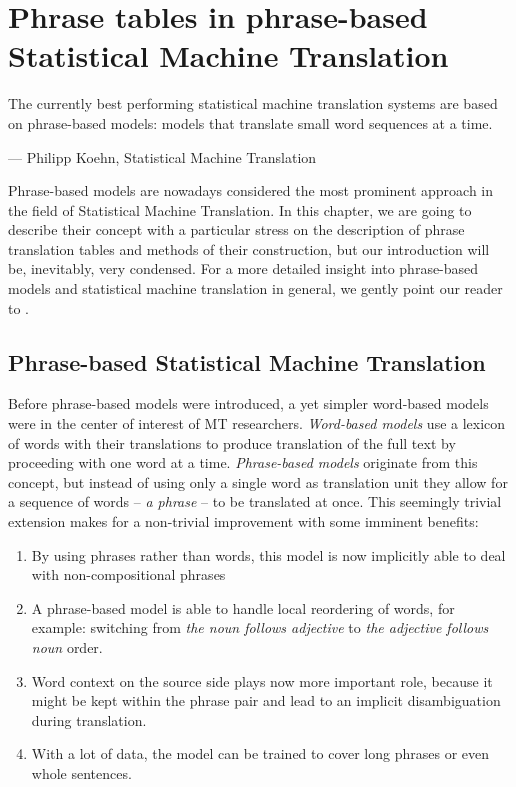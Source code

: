 
\chapter{Phrase tables in phrase-based Statistical Machine Translation}
\label{chap:phrase-based}


\setlength{\epigraphwidth}{1.0\textwidth}
\epigraph{The currently best performing statistical machine translation systems are based on
phrase-based models: models that translate small word sequences at a time.}{--- Philipp Koehn, Statistical Machine Translation}

Phrase-based models are nowadays considered the most prominent approach
in the field of Statistical Machine Translation.
In this chapter, we are going to describe their concept with a particular stress
on the description of phrase translation tables and methods of their construction,
but our introduction will be, inevitably, very condensed.
For a more detailed insight into phrase-based models and statistical machine
translation in general, we gently point our reader to \citet{koehn:smt}.

\section{Phrase-based Statistical Machine Translation}

Before phrase-based models were introduced, a yet simpler word-based models were in
the center of interest of MT researchers.
\emph{Word-based models} use a lexicon of words with their translations to produce
translation of the full text by proceeding with one word at a time.
\emph{Phrase-based models} originate from this concept, but instead of using only
a single word as translation unit they allow for a sequence of words -- \emph{a phrase}
-- to be translated at once.
This seemingly trivial extension makes for a non-trivial improvement with some
imminent benefits:
\begin{enumerate}
  \item By using phrases rather than words, this model is now implicitly able to deal
    with non-compositional phrases
  \item A phrase-based model is able to handle local reordering of words, for example:
    switching from \emph{the noun follows adjective} to \emph{the adjective follows noun} order.
  \item Word context on the source side plays now more important role, because it might be kept
    within the phrase pair and lead to an implicit disambiguation during translation.
  \item With a lot of data, the model can be trained to cover long phrases or even
    whole sentences.
\end{enumerate}

